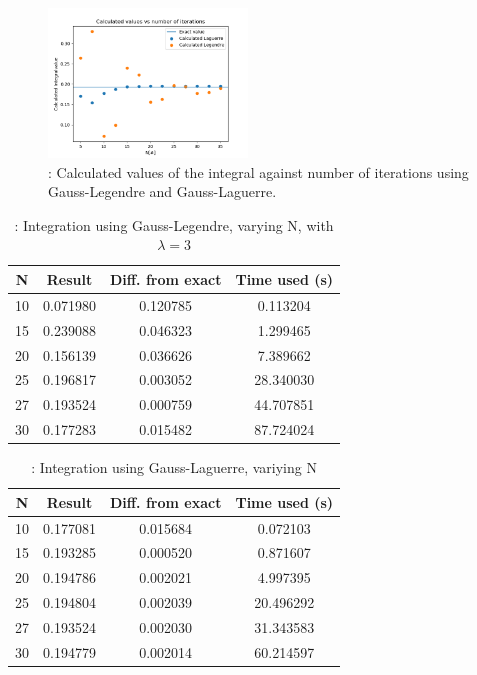 \documentclass{article}
\begin{document}
	\begin{figure}[hbt]
	\begin{center}
			\includegraphics[width=200px]{Leg_lag_int.png}
			\caption{: Calculated values of the integral against number of iterations using Gauss-Legendre and Gauss-Laguerre.}
			\label{fig:int}
	\end{center}
	\end{figure}

	\begin{table}[h!]
		\caption{: Integration using Gauss-Legendre, varying N, with $\lambda=3$ }
			\label{Tab: Legendre}
		\begin{tabular}{c c c c}
			N & Result & Diff. from exact & Time used (s)\\
			\hline
			10 & 0.071980 & 0.120785  & 0.113204\\
			15 & 0.239088 & 0.046323  & 1.299465\\
			20 & 0.156139 & 0.036626  & 7.389662\\
			25 & 0.196817 & 0.003052  & 28.340030\\
			27 & 0.193524 & 0.000759  & 44.707851\\
			30 & 0.177283 & 0.015482  & 87.724024\\
		\end{tabular}
	\end{table}

	\begin{table}[h!]
		\caption{: Integration using Gauss-Laguerre, variying N}
		\begin{tabular}{c c c c}
			N & Result & Diff. from exact & Time used (s)\\
			\hline
			10 & 0.177081 & 0.015684 & 0.072103\\
			15 & 0.193285 & 0.000520 & 0.871607\\
			20 & 0.194786 & 0.002021 & 4.997395\\
			25 & 0.194804 & 0.002039 & 20.496292\\
			27 & 0.193524 & 0.002030 & 31.343583\\
			30 & 0.194779 & 0.002014 & 60.214597\\
		\end{tabular}
		\label{Tab: Laguerre}
	\end{table}
\end{document}
